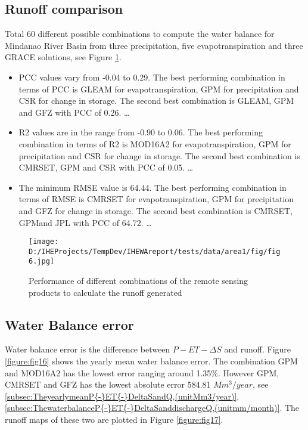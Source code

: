 \documentclass{article}%
\begin{document}
\subsection{Runoff comparison}%
\label{subsec:Runoffcomparison}%
Total 60 different possible combinations to compute the water balance for Mindanao River Basin from three precipitation, five evapotranspiration and three GRACE solutions, see Figure \ref{figure:fig15}.%
\linebreak%
\begin{itemize}%
\item%
PCC values vary from {-}0.04 to 0.29. The best performing combination in terms of PCC is GLEAM for evapotranspiration, GPM for precipitation and CSR for change in storage. The second best combination is GLEAM, GPM and GFZ with PCC of 0.26.%
\ldots%
\item%
R2 values are in the range from {-}0.90 to 0.06. The best performing combination in terms of R2 is MOD16A2 for evapotranspiration, GPM for precipitation and CSR for change in storage. The second best combination is CMRSET, GPM and CSR with PCC of 0.05.%
\ldots%
\item%
The minimum RMSE value is 64.44. The best performing combination in terms of RMSE is CMRSET for evapotranspiration, GPM for precipitation and GFZ for change in storage. The second best combination is CMRSET, GPMand JPL with PCC of 64.72.%
\ldots%
\end{itemize}%


\begin{figure}[H]%
\centering%
\texttt{[image: D:/IHEProjects/TempDev/IHEWAreport/tests/data/area1/fig/fig6.jpg]}%
\caption{Performance of different combinations of the remote sensing products to calculate the runoff generated}%
\label{figure:fig15}%
\end{figure}

%
\subsection{Water Balance error}%
\label{subsec:WaterBalanceerror}%
Water balance error is the difference between $P-ET-\Delta S$ and runoff. Figure \ref{figure:fig16} shows the yearly mean water balance error. The combination GPM and MOD16A2 has the lowest error ranging around 1.35\%. However GPM, CMRSET and GFZ has the lowest absolute error 584.81 $Mm^3/year$, see \ref{subsec:TheyearlymeanP{-}ET{-}DeltaSandQ,(unitMm3/year)}, \ref{subsec:ThewaterbalanceP{-}ET{-}DeltaSanddischargeQ,(unitmm/month)}. The runoff maps of these two are plotted in Figure \ref{figure:fig17}.%
\linebreak%
\end{document}
